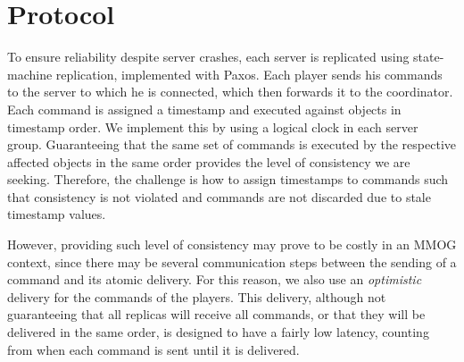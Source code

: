 \documentclass[times, 10pt]{article}
\begin{document}
% 
%
%



\section{Protocol}

To ensure reliability despite server crashes, each server is replicated using state-machine replication, implemented with Paxos. Each player sends his commands to the server to which he is connected, which then forwards it to the coordinator. Each command is assigned a timestamp and executed against objects in timestamp order. We implement this by using a logical clock in each server group. Guaranteeing that the same set of commands is executed by the respective affected objects in the same order provides the level of consistency we are seeking. Therefore, the challenge is how to assign timestamps to commands such that consistency is not violated and commands are not discarded due to stale timestamp values.

However, providing such level of consistency may prove to be costly in an MMOG context, since there may be several communication steps between the sending of a command and its atomic delivery. For this reason, we also use an \emph{optimistic} delivery for the commands of the players. This delivery, although not guaranteeing that all replicas will receive all commands, or that they will be delivered in the same order, is designed to have a fairly low latency, counting from when each command is sent until it is delivered.
\end{document}
